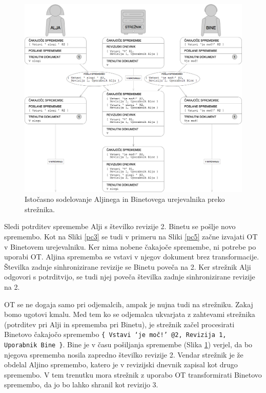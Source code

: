 \documentclass[a4paper, 12pt, twoside]{book}
\begin{document}
\begin{figure}[placement h]
\begin{center}
\includegraphics[width=14cm]{pc4.png}
\end{center}
\caption{Istočasno sodelovanje Aljinega in Binetovega urejevalnika preko strežnika.}
\label{pc4}
\end{figure}

Sledi potrditev spremembe Alji s številko revizije 2. Binetu se pošlje novo spremembo. Kot na Sliki \ref{pc3} se tudi v primeru na Sliki \ref{pc5} začne izvajati OT v Binetovem urejevalniku. Ker nima nobene čakajoče spremembe, ni potrebe po uporabi OT. Aljina sprememba se vstavi v njegov dokument brez transformacije. Številka zadnje sinhronizirane revizije se Binetu poveča na 2. Ker strežnik Alji odgovori s potrditvijo, se tudi njej poveča številka zadnje sinhronizirane revizije na 2.

\pagebreak

OT se ne dogaja samo pri odjemalcih, ampak je nujna tudi na strežniku. Zakaj bomo ugotovi kmalu. Med tem ko se odjemalca ukvarjata z zahtevami strežnika (potrditev pri Alji in sprememba pri Binetu), je strežnik začel procesirati Binetovo čakajočo spremembo {\tt \{ Vstavi ‘je moč!’ @2, Revizija 1, Uporabnik Bine \}}. Bine je v času pošiljanja spremembe (Slika \ref{pc4}) verjel, da bo njegova sprememba nosila zapredno številko revizije 2. Vendar strežnik je že obdelal Aljino spremembo, katero je v revizijski dnevnik zapisal kot drugo spremembo. V tem trenutku mora strežnik z uporabo OT transformirati Binetovo spremembo, da jo bo lahko shranil kot revizijo 3.
\end{document}
